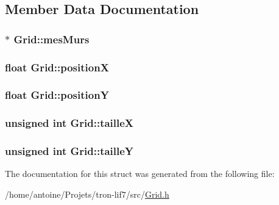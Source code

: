 \subsection{Member Data Documentation}
\hypertarget{structGrid_a3ddcfd994b5a6f3f6d73aefc923b65f8}{
\subsubsection[{mes\-Murs}]{$\ast$ Grid\-::mes\-Murs}}\label{structGrid_a3ddcfd994b5a6f3f6d73aefc923b65f8}
\hypertarget{structGrid_a1712b348175d1449f924218abc2c180b}{
\subsubsection[{position\-X}]{\setlength{\rightskip}{0pt plus 5cm}float Grid\-::position\-X}}\label{structGrid_a1712b348175d1449f924218abc2c180b}
\hypertarget{structGrid_aa084d4ec2894df907e02718c88ab4060}{
\subsubsection[{position\-Y}]{\setlength{\rightskip}{0pt plus 5cm}float Grid\-::position\-Y}}\label{structGrid_aa084d4ec2894df907e02718c88ab4060}
\hypertarget{structGrid_ad6ec58066a6303fbc2aa5443840cf067}{
\subsubsection[{taille\-X}]{\setlength{\rightskip}{0pt plus 5cm}unsigned int Grid\-::taille\-X}}\label{structGrid_ad6ec58066a6303fbc2aa5443840cf067}
\hypertarget{structGrid_adc12ffc8da211af2444db8a2007e5a7d}{
\subsubsection[{taille\-Y}]{\setlength{\rightskip}{0pt plus 5cm}unsigned int Grid\-::taille\-Y}}\label{structGrid_adc12ffc8da211af2444db8a2007e5a7d}


The documentation for this struct was generated from the following file\-:\begin{DoxyCompactItemize}
\item 
/home/antoine/\-Projets/tron-\/lif7/src/\hyperlink{Grid_8h}{Grid.\-h}\end{DoxyCompactItemize}
